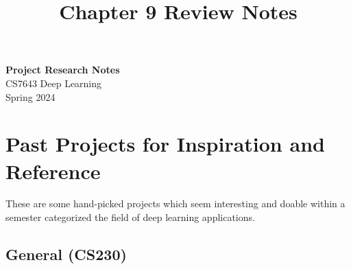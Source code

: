 \documentclass[11pt]{article}
\theoremstyle{definition}
\begin{document}
\setcounter{section}{0}
\title{Chapter 9 Review Notes}

\thispagestyle{empty}

\begin{center}
{\LARGE \bf Project Research Notes}\\
{\large CS7643 Deep Learning}\\
Spring 2024
\end{center}
\section{Past Projects for Inspiration and Reference}
These are some hand-picked projects which seem interesting and doable within a semester categorized the field of deep learning applications.

\subsection{General (CS230)}
\end{document}
